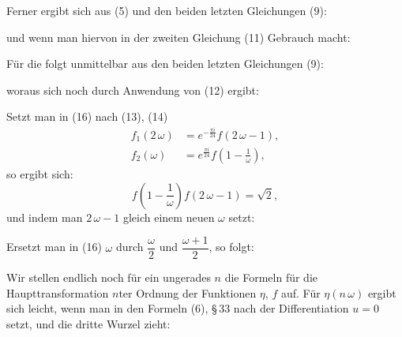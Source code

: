 Ferner ergibt sich aus (5) und den beiden letzten Gleichungen (9):

und wenn man hiervon in der zweiten Gleichung (11) Gebrauch macht:

Für die  folgt unmittelbar aus den beiden letzten Gleichungen (9):

woraus sich noch durch Anwendung von (12) ergibt:

Setzt man in (16) nach (13), (14)
\[
\begin{aligned}
f_1(2\,\omega) &= e^{-\frac{\pi i}{24}} f(2\,\omega - 1),\\
f_2(\omega) &= e^{\frac{\pi i}{24}} f\!\left(1 - \frac{1}{\omega}\right),
\end{aligned}
\]
so ergibt sich:
\[
f\!\left(1 - \frac{1}{\omega}\right) f(2\,\omega - 1) = \sqrt{2},
\]
und indem man $2\,\omega - 1$ gleich einem neuen $\omega$ setzt:

Ersetzt man in (16) $\omega$ durch $\dfrac{\omega}{2}$ und $\dfrac{\omega+1}{2}$, so folgt:

Wir stellen endlich noch für ein ungerades $n$ die Formeln für die Haupttransformation $n$ter Ordnung der Funktionen $\eta$, $f$ auf. Für $\eta(n\,\omega)$ ergibt sich leicht, wenn man in den Formeln (6), \S\,33 nach der Differentiation $u = 0$ setzt, und die dritte Wurzel zieht:

